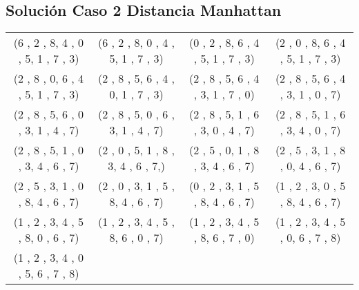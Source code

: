 \documentclass[11pt]{article}
\begin{document}
\subsection{Solución Caso 2 Distancia Manhattan}
\begin{tabular}{c c c c}
(6 , 2 , 8,
4 , 0 , 5,
1 , 7 , 3)
&

(6 , 2 , 8,
0 , 4 , 5,
1 , 7 , 3)
&

(0 , 2 , 8,
6 , 4 , 5,
1 , 7 , 3)
&

(2 , 0 , 8,
6 , 4 , 5,
1 , 7 , 3)
\\

(2 , 8 , 0,
6 , 4 , 5,
1 , 7 , 3)
&

(2 , 8 , 5,
6 , 4 , 0,
1 , 7 , 3)
&

(2 , 8 , 5,
6 , 4 , 3,
1 , 7 , 0)
&

(2 , 8 , 5,
6 , 4 , 3,
1 , 0 , 7)
\\

(2 , 8 , 5,
6 , 0 , 3,
1 , 4 , 7)
&

(2 , 8 , 5,
0 , 6 , 3,
1 , 4 , 7)
&

(2 , 8 , 5,
1 , 6 , 3,
0 , 4 , 7)
&

(2 , 8 , 5,
1 , 6 , 3,
4 , 0 , 7)
\\

(2 , 8 , 5,
1 , 0 , 3,
4 , 6 , 7)
&

(2 , 0 , 5,
1 , 8 , 3,
4 , 6 , 7,)
&

(2 , 5 , 0,
1 , 8 , 3,
4 , 6 , 7)
&

(2 , 5 , 3,
1 , 8 , 0,
4 , 6 , 7)
\\

(2 , 5 , 3,
1 , 0 , 8,
4 , 6 , 7)
&

(2 , 0 , 3,
1 , 5 , 8,
4 , 6 , 7)
&

(0 , 2 , 3,
1 , 5 , 8,
4 , 6 , 7)
&

(1 , 2 , 3,
0 , 5 , 8,
4 , 6 , 7)

\\


(1 , 2 , 3,
4 , 5 , 8,
0 , 6 , 7)

&
(1 , 2 , 3,
4 , 5 , 8,
6 , 0 , 7)

&
(1 , 2 , 3,
4 , 5 , 8,
6 , 7 , 0)

&
(1 , 2 , 3,
4 , 5 , 0,
6 , 7 , 8)

\\
(1 , 2 , 3,
4 , 0 , 5,
6 , 7 , 8)
&

&

&
\\
\end{tabular}
\clearpage
\end{document}
